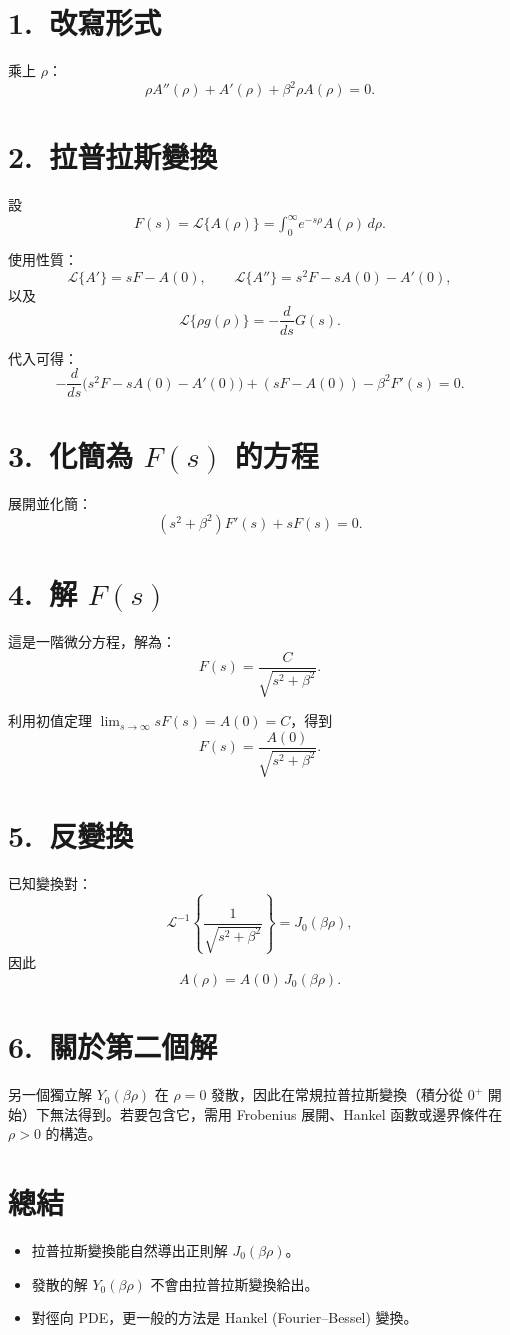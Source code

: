 \documentclass{article}
\def\int{\text{∫}}%
\begin{document}
\section*{1.~改寫形式}
乘上 $\rho$：
\[
\rho A''(\rho)+A'(\rho)+\beta^2 \rho A(\rho)=0.
\]

\section*{2.~拉普拉斯變換}
設
\[
F(s)=\mathcal{L}\{A(\rho)\}=\int_0^\infty e^{-s\rho}A(\rho)\,d\rho.
\]

使用性質：
\[
\mathcal{L}\{A'\}=sF-A(0), \qquad 
\mathcal{L}\{A''\}=s^2F-sA(0)-A'(0),
\]
以及
\[
\mathcal{L}\{\rho g(\rho)\}=-\frac{d}{ds}G(s).
\]

代入可得：
\[
-\frac{d}{ds}\!\big(s^2F-sA(0)-A'(0)\big)+(sF-A(0))-\beta^2 F'(s)=0.
\]

\section*{3.~化簡為 $F(s)$ 的方程}
展開並化簡：
\[
(s^2+\beta^2)F'(s)+sF(s)=0.
\]

\section*{4.~解 $F(s)$}
這是一階微分方程，解為：
\[
F(s)=\frac{C}{\sqrt{s^2+\beta^2}}.
\]

利用初值定理 $\lim_{s\to\infty} sF(s)=A(0)=C$，得到
\[
F(s)=\frac{A(0)}{\sqrt{s^2+\beta^2}}.
\]

\section*{5.~反變換}
已知變換對：
\[
\mathcal{L}^{-1}\!\left\{\frac{1}{\sqrt{s^2+\beta^2}}\right\}=J_0(\beta\rho),
\]
因此
\[
A(\rho)=A(0)\,J_0(\beta\rho).
\]

\section*{6.~關於第二個解}
另一個獨立解 $Y_0(\beta\rho)$ 在 $\rho=0$ 發散，因此在常規拉普拉斯變換（積分從 $0^+$ 開始）下無法得到。若要包含它，需用 Frobenius 展開、Hankel 函數或邊界條件在 $\rho>0$ 的構造。

\section*{總結}
\begin{itemize}
    \item 拉普拉斯變換能自然導出正則解 $J_0(\beta\rho)$。
    \item 發散的解 $Y_0(\beta\rho)$ 不會由拉普拉斯變換給出。
    \item 對徑向 PDE，更一般的方法是 Hankel (Fourier--Bessel) 變換。
\end{itemize}
\end{document}
